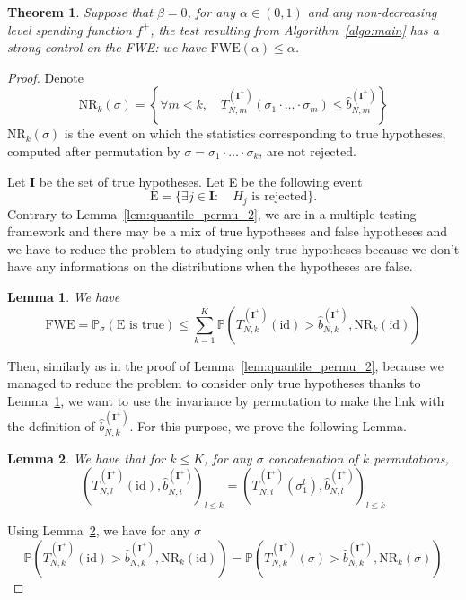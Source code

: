 \documentclass{article}
\theoremstyle{plain}
\newtheorem{Theorem}{Theorem}
\newtheorem{Lemma}{Lemma}
\theoremstyle{remark}
\renewcommand{\P}{\mathbb{P}}
\newcommand{\1}{\mathbbm{1}}
\newcommand{\id}{\mathrm{id}}
\numberwithin{equation}{section}
\begin{document}
\begin{Theorem}\label{th:multi_FWE}
Suppose that $\beta = 0$, for any $\alpha \in (0,1)$ and any non-decreasing level spending function $f^+$, the test resulting from Algorithm~\ref{algo:main} has a strong control on the FWE: we have $\mathrm{FWE}(\alpha)\le\alpha$.
\end{Theorem}
\begin{proof}
Denote 
$$\mathrm{NR}_k(\sigma) = \left\{\forall m < k,\quad  T_{N,m}^{(\textbf{I}^+)}(\sigma_1\cdot\ldots\cdot\sigma_m) \le   \widehat{b}_{N,m}^{(\textbf{I}^+)}\right\}$$
$\mathrm{NR}_k(\sigma)$ is the event on which the statistics corresponding to true hypotheses, computed after permutation by $\sigma=\sigma_1\cdot \ldots \cdot \sigma_k$, are not rejected.


Let $\textbf{I}$ be the set of true hypotheses. Let E be the following event
$$\mathrm{E}= \{ \exists j \in \textbf{I}: \quad H_j \text{ is rejected}\}.$$
Contrary to Lemma~\ref{lem:quantile_permu_2}, we are in a multiple-testing framework and there may be a mix of true hypotheses and false hypotheses and we have to reduce the problem to studying only true hypotheses because we don't have any informations on the distributions when the hypotheses are false.
\begin{Lemma}\label{lem:multiple_test_FWE}
We have 
$$\mathrm{FWE} = \P_\sigma\left(\text{E is true} \right) \le \sum_{k=1}^K\P\left( T_{N,k}^{(\textbf{I}^+)}(\id) > \widehat{b}_{N,k}^{(\textbf{I}^+)}, \mathrm{NR}_k(\id)\right)  $$
\end{Lemma}
Then, similarly as in the proof of Lemma~\ref{lem:quantile_permu_2}, because we managed to reduce the problem to consider only true hypotheses thanks to Lemma~\ref{lem:multiple_test_FWE}, we want to use the invariance by permutation to make the link with the definition of $\widehat{b}_{N,k}^{(\textbf{I}^+)}$. For this purpose, we prove the following Lemma.


\begin{Lemma}\label{lem:invariance}
We have that for $k \le K$, for any $\sigma$ concatenation of $k$ permutations, 
$$(T_{N,l}^{(\textbf{I}^+)}(\id),\widehat{b}_{N,i}^{(\textbf{I}^+)})_{l\le k}=(T_{N,i}^{(\textbf{I}^+)}(\sigma_1^l), \widehat{b}_{N,l}^{(\textbf{I}^+)})_{l\le k}$$
\end{Lemma}
Using Lemma~\ref{lem:invariance}, we have for any $\sigma$
$$\P\left(T_{N,k}^{(\textbf{I}^+)}(\id) > \widehat{b}_{N,k}^{(\textbf{I}^+)}, \mathrm{NR}_k(\id ) \right) = \P\left(T_{N,k}^{(\textbf{I}^+)}(\sigma) > \widehat{b}_{N,k}^{(\textbf{I}^+)}, \mathrm{NR}_k(\sigma) \right)$$


\end{proof}
\end{document}
